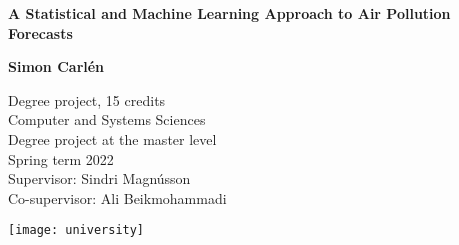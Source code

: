 \begin{titlepage}
    \begin{center}
        \vspace*{2cm}
            
        \Huge
        \textbf{A Statistical and Machine Learning Approach to Air Pollution Forecasts}
            
        \vspace{0.25cm}
        
        \LARGE
            
        \vspace{1cm}
            
        \textbf{Simon Carlén}
            
        \vspace{250pt plus 1pt minus 1pt}
            
            
         
        	\vspace{.75cm}
	\large

	\begin{minipage}{0.65\textwidth}
	Degree project, 15 credits \\\indent
	Computer and Systems Sciences \\\indent
	Degree project at the master level \\\indent
	Spring term 2022 \\\indent 
	Supervisor: Sindri Magnússon \\\indent
	Co-supervisor: Ali Beikmohammadi
	\end{minipage}
	\begin{minipage}{0.32\textwidth}
	\begin{center}
    		\texttt{[image: university]}
	\end{center}
	\end{minipage}

    \end{center}
\end{titlepage}